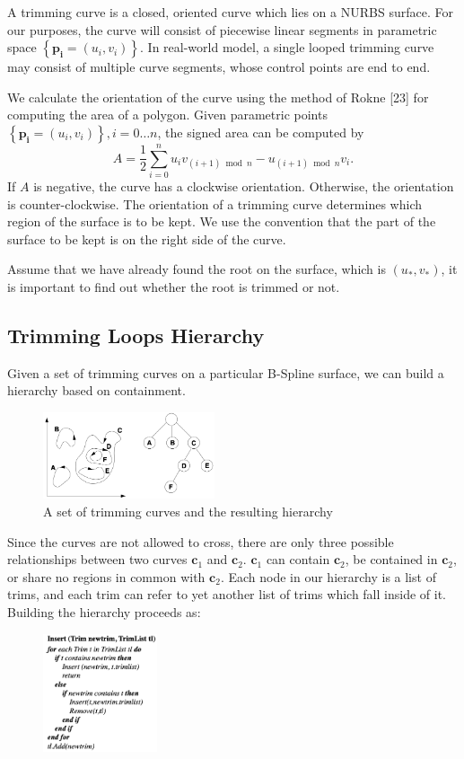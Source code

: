 \documentclass[acmtog]{acmart}
\begin{document}
A trimming curve is a closed, oriented curve which lies on a NURBS surface. For our purposes, the curve will consist of piecewise linear segments in parametric space $\left\{\mathbf{p}_{\mathbf{i}}=\left(u_i, v_i\right)\right\}$. In real-world model, a single looped trimming curve may consist of multiple curve segments, whose control points are end to end.

We calculate the orientation of the curve using the method of Rokne [23] for computing the area of a polygon. Given parametric points $\left\{\mathbf{p}_{\mathbf{i}}=\left(u_i, v_i\right)\right\}, i=0 \ldots n$, the signed area can be computed by
$$
A=\frac{1}{2} \sum_{i=0}^n u_i v_{(i+1) \bmod n}-u_{(i+1) \bmod n} v_i .
$$
If $A$ is negative, the curve has a clockwise orientation. Otherwise, the orientation is counter-clockwise. The orientation of a trimming curve determines which region of the surface is to be kept. We use the convention that the part of the surface to be kept is on the right side of the curve.

Assume that we have already found the root on the surface, which is $(u_*,v_*)$, it is important to find out whether the root is trimmed or not.

\subsection{Trimming Loops Hierarchy}
\hspace*{8pt}
Given a set of trimming curves on a particular B-Spline surface, we can build a hierarchy based on containment.
\begin{figure}[htbp]
    \centering
    \includegraphics[width=0.45\textwidth]{hie.png}
    \caption{A set of trimming curves and the resulting hierarchy}
\end{figure}

Since the curves are not allowed to cross, there are only three possible relationships between two curves $\mathbf{c}_1$ and $\mathbf{c}_2$. $\mathbf{c}_1$ can contain $\mathbf{c}_2$, be contained in $\mathbf{c}_2$, or share no regions in common with $\mathbf{c}_2$. Each node in our hierarchy is a list of trims, and each trim can refer to yet another list of trims which fall inside of it. Building the hierarchy proceeds as:
\begin{figure}[htbp]
    \centering
    \includegraphics[width=0.3\textwidth, height=0.3\textwidth]{algo1.png}
\end{figure}
\end{document}
